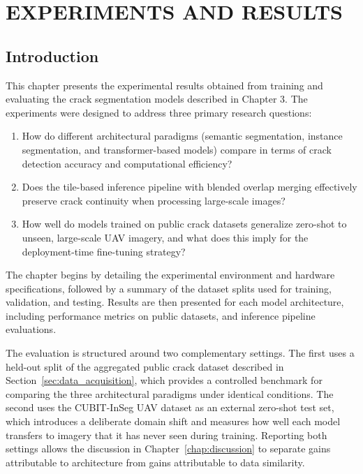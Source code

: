 \chapter{EXPERIMENTS AND RESULTS}
\label{chap:experiments_and_results}

\section{Introduction}
\hs This chapter presents the experimental results obtained from training and evaluating the crack segmentation models described in Chapter 3. The experiments were designed to address three primary research questions:

\begin{enumerate}
    \item How do different architectural paradigms (semantic segmentation, instance segmentation, and transformer-based models) compare in terms of crack detection accuracy and computational efficiency?
    \item Does the tile-based inference pipeline with blended overlap merging effectively preserve crack continuity when processing large-scale images?
    \item How well do models trained on public crack datasets generalize zero-shot to unseen, large-scale UAV imagery, and what does this imply for the deployment-time fine-tuning strategy?
\end{enumerate}

\hs The chapter begins by detailing the experimental environment and hardware specifications, followed by a summary of the dataset splits used for training, validation, and testing. Results are then presented for each model architecture, including performance metrics on public datasets, and inference pipeline evaluations.

\hs The evaluation is structured around two complementary settings. The first uses a held-out split of the aggregated public crack dataset described in Section~\ref{sec:data_acquisition}, which provides a controlled benchmark for comparing the three architectural paradigms under identical conditions. The second uses the CUBIT-InSeg UAV dataset as an external zero-shot test set, which introduces a deliberate domain shift and measures how well each model transfers to imagery that it has never seen during training. Reporting both settings allows the discussion in Chapter~\ref{chap:discussion} to separate gains attributable to architecture from gains attributable to data similarity.

